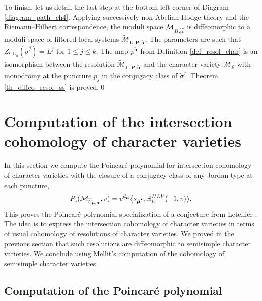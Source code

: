 \documentclass[11pt]{article}
\newcommand{\NoChangel}[1]{%
\expandafter\let\csname old\string#1\endcsname=#1
\let#1=\relax
\newcommand{#1}{\mathcode`l="716C\csname old\string#1\endcsname\mathcode`l="7160 }%
}
\newcommand{\Dol}{\mathrm{Dol}}\NoChangel{\Dol}
\newcommand{\rc}{\mathrm{c}}
\newcommand{\HLV}{\textup{HLV}}
\newcommand{\blangle}{\bigl\langle}
\newcommand{\brangle}{\bigr\rangle}
\theoremstyle{definition}
\theoremstyle{plain}
\DeclareMathOperator{\GL}{GL}
\begin{document}
To finish, let us detail the last step at the bottom left corner of Diagram \eqref{diagram_path_ch4}. Applying successively non-Abelian Hodge theory and the Riemann--Hilbert correspondence, the moduli space $\mathcal{M}_{B,\widetilde{\alpha}}^{\Dol}$ is diffeomorphic to a moduli space of filtered local systems $\widetilde{\mathcal{M}}_{\boldsymbol{L},\boldsymbol{P},\boldsymbol{\widetilde{\sigma}}}$. The parameters are such that $Z_{\GL_n}(\widetilde{\sigma}^j) = L^j$ for $1\le j \le k$. The map $p^{\boldsymbol{\widetilde{\sigma}}}$ from Definition \ref{def_resol_char} is an isomorphism between the resolution $\widetilde{\mathcal{M}}_{\boldsymbol{L},\boldsymbol{P},\boldsymbol{\widetilde{\sigma}}}$ and the character variety $\mathcal{M}_{\boldsymbol{\mathcal{S}}}$ with monodromy at the puncture $p_j$ in the conjugacy class of $\widetilde{\sigma}^j$. Theorem \ref{th_diffeo_resol_ss} is proved.\qed

\section{Computation of the intersection cohomology of character varieties}\label{sect_computation_pc}
In this section we compute the Poincaré polynomial for intersection cohomology of character varieties with the closure of a conjugacy class of any Jordan type at each puncture,
\[
P_{\rc}(\mathcal{M}_{\overline{{\mathcal{C}}}_{\boldsymbol{\mu},\boldsymbol{\sigma}}},v) = v^{d_{\boldsymbol{\mu}}}\blangle s_{\boldsymbol{\mu'}}, \mathbb{H}_n^{\HLV}(-1,v)\brangle.
\]
This proves the Poincaré polynomial specialization of a conjecture from Letellier \cite{Letellier13}. The idea is to express the intersection cohomology of character varieties in terms of usual cohomology of resolutions of character varieties.
We proved in the previous section that such resolutions are diffeomorphic to semisimple character varieties. We conclude using Mellit's computation \cite{Mellit2020} of the cohomology of semisimple character varieties.

\subsection{Computation of the Poincaré polynomial}\label{sect_poincare_comput}
\end{document}
